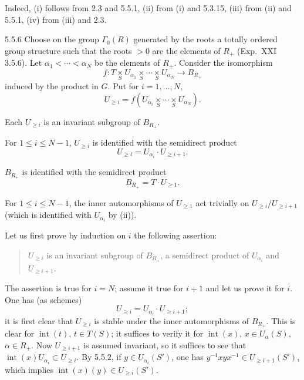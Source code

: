 Indeed, (i) follows from 2.3 and 5.5.1, (ii) from (i) and 5.3.15, (iii) from (ii) and 5.5.1, (iv) from (iii) and 2.3.
\begin{lemma}{5.5.6}\label{XXII.5.5.6}
Choose on the group $\Gamma_0(R)$ generated by the roots a totally ordered group structure such that the roots $>0$ are the elements of $R_+$ (\cf Exp.~XXI 3.5.6){\renewcommand{\thefootnote}{(38)}}. Let $\alpha_1<\cdots<\alpha_N$ be the elements of $R_+$. Consider the isomorphism
\[
f:T\underset S\times U_{\alpha_1}\underset S\times\cdots\underset S\times U_{\alpha_N}\to B_{R_+}
\]
induced by the product in $G$. Put for $i=1,\ldots,N$,
\[
U_{\ge i}=f(U_{\alpha_i}\underset S\times\cdots\underset S\times U_{\alpha_N}).
\]
\begin{enumeratei}
\item Each $U_{\ge i}$ is an invariant subgroup of $B_{R_+}$.
\item For $1\le i\le N-1$, $U_{\ge i}$ is identified with the semidirect product
\[
U_{\ge i}=U_{\alpha_i}\cdot U_{\ge i+1}.
\]
\item $B_{R_+}$ is identified with the semidirect product
\[
B_{R_+}=T\cdot U_{\ge1}.
\]
\item For $1\le i\le N-1$, the inner automorphisms of $U_{\ge1}$ act trivially on $U_{\ge i}/U_{\ge i+1}$ (which is identified with $U_{\alpha_i}$ by (ii)).
\end{enumeratei}
\end{lemma}
Let us first prove by induction on $i$ the following assertion:
\begin{quote}
$U_{\ge i}$ is an invariant subgroup of $B_{R_+}$, a semidirect product of $U_{\alpha_i}$ and $U_{\ge i+1}$.
\end{quote}
The assertion is true for $i=N$; assume it true for $i+1$ and let us prove it for $i$. One has (as schemes)
\[
U_{\ge i}=U_{\alpha_i}\cdot U_{\ge i+1};
\]
it is first clear that $U_{\ge i}$ is stable under the inner automorphisms of $B_{R_+}$. This is clear for $\operatorname{int}(t)$, $t\in T(S)$; it suffices to verify it for $\operatorname{int}(x)$, $x\in U_\alpha(S)$, $\alpha\in R_+$. Now $U_{\ge i+1}$ is assumed invariant, so it suffices to see that $\operatorname{int}(x)U_{\alpha_i}\subset U_{\ge i}$. By 5.5.2, if $y\in U_{\alpha_i}(S')$, one has $y^{-1}xyx^{-1}\in U_{\ge i+1}(S')$, which implies $\operatorname{int}(x)(y)\in U_{\ge i}(S')$.

